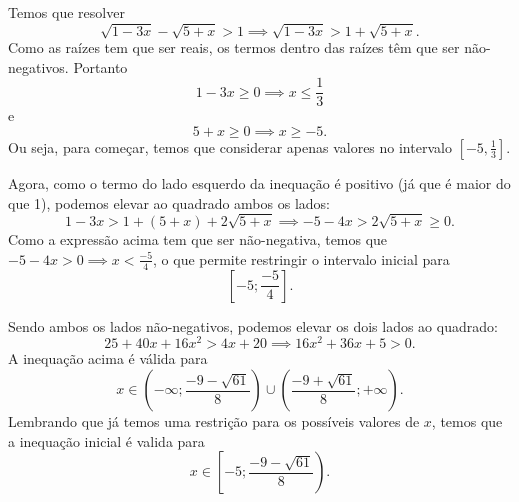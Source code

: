 Temos que resolver
\[
	\sqrt{1-3x}-\sqrt{5+x}>1\implies \sqrt{1-3x}>1+\sqrt{5+x}.
\]
Como as raízes tem que ser reais, os termos dentro das raízes têm que ser não-negativos.
Portanto
\[
	1-3x\geq 0\implies x\leq \frac{1}{3}
\]
e
\[
	5+x\geq 0\implies x\geq -5.
\]
Ou seja, para começar, temos que considerar apenas valores no intervalo $\left[-5,\frac{1}{3}\right]$.

Agora, como o termo do lado esquerdo da inequação é positivo (já que é maior do que 1), podemos elevar ao quadrado ambos os lados:
\[
	1-3x>1+(5+x)+2\sqrt{5+x}\implies -5-4x>2\sqrt{5+x}\geq 0.
\]
Como a expressão acima tem que ser não-negativa, temos que $-5-4x>0\implies x<\frac{-5}{4}$, o que permite restringir o intervalo
inicial para
\[
	\left[-5;\frac{-5}{4}\right].
\]

Sendo ambos os lados não-negativos, podemos elevar os dois lados ao quadrado:
\[
	25+40x+16x^2>4x+20\implies 16x^2+36x+5>0.
\]
A inequação acima é válida para
\[
	x\in\left(-\infty;\frac{-9-\sqrt{61}}{8}\right)\cup\left(\frac{-9+\sqrt{61}}{8};+\infty\right).
\]
Lembrando que já temos uma restrição para os possíveis valores de $x$, temos que a inequação inicial é valida para
\[
	x\in\left[-5;\frac{-9-\sqrt{61}}{8}\right).
\]
